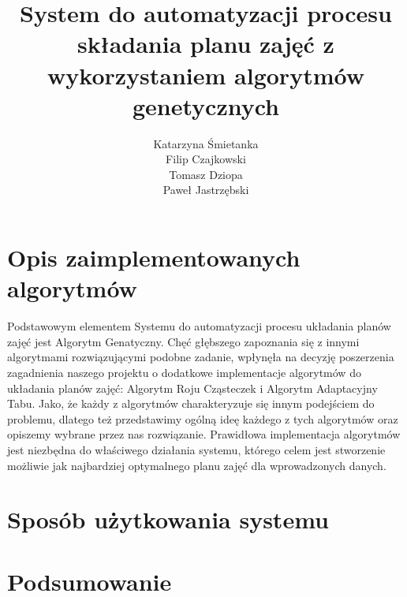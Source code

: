\documentclass[11pt]{report}
\title{System do automatyzacji procesu składania planu zajęć z wykorzystaniem algorytmów genetycznych}
\author{
	Katarzyna Śmietanka \\
	Filip Czajkowski \\
	Tomasz Dziopa\\
	Paweł Jastrzębski
}
\begin{document}
%
%

\maketitle
\tableofcontents









\chapter{Opis zaimplementowanych algorytmów}
\par Podstawowym elementem Systemu do automatyzacji procesu układania planów zajęć jest Algorytm Genatyczny. Chęć głębszego zapoznania się z innymi algorytmami rozwiązującymi podobne zadanie, wpłynęła na decyzję poszerzenia zagadnienia naszego projektu o dodatkowe implementacje algorytmów do układania planów zajęć: Algorytm Roju Cząsteczek i Algorytm Adaptacyjny Tabu. 
Jako, że każdy z algorytmów charakteryzuje się innym podejściem do problemu, dlatego też przedstawimy ogólną ideę każdego z tych algorytmów oraz opiszemy wybrane przez nas rozwiązanie. Prawidłowa implementacja algorytmów jest niezbędna do właściwego działania systemu, którego celem jest stworzenie możliwie jak najbardziej optymalnego planu zajęć dla wprowadzonych danych.








\chapter{Sposób użytkowania systemu}

\chapter{Podsumowanie}

\end{document}
